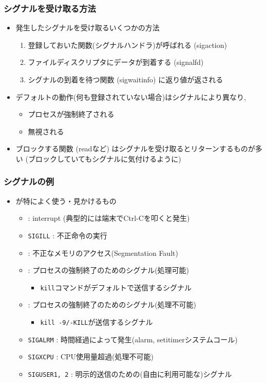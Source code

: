 \documentclass[12pt,dvipdfmx]{beamer}
\begin{document}
\begin{frame}
  \frametitle{シグナルを受け取る方法}
  \begin{itemize}
  \item 発生したシグナルを受け取るいくつかの方法
    \begin{enumerate}
    \item 登録しておいた関数(シグナルハンドラ)が呼ばれる (sigaction)
    \item ファイルディスクリプタにデータが到着する (signalfd)
    \item シグナルの到着を待つ関数 (sigwaitinfo) に返り値が返される
    \end{enumerate}
  \item デフォルトの動作(何も登録されていない場合)はシグナルにより異なり,
    \begin{itemize}
    \item プロセスが強制終了される
    \item 無視される
    \end{itemize}
  \item ブロックする関数 (readなど) はシグナルを受け取るとリターンするものが多い
    (ブロックしていてもシグナルに気付けるように)
  \end{itemize}
\end{frame}

\begin{frame}
  \frametitle{シグナルの例}
  \begin{itemize}
  \item []
    が特によく使う・見かけるもの
    \begin{itemize}
    \item {} : interrupt (典型的には端末でCtrl-Cを叩くと発生)
    \item {\tt SIGILL} : 不正命令の実行
    \item {} : 不正なメモリのアクセス(Segmentation Fault)
    \item {} : プロセスの強制終了のためのシグナル(処理可能)
      \begin{itemize}
      \item {\tt kill}コマンドがデフォルトで送信するシグナル
      \end{itemize}
    \item {} :
      プロセスの強制終了のためのシグナル(処理不可能)
      \begin{itemize}
      \item {\tt kill -9/-KILL}が送信するシグナル
      \end{itemize}
    \item {\tt SIGALRM} :
      時間経過によって発生(alarm, setitimerシステムコール)
    \item {\tt SIGXCPU} :
      CPU使用量超過(処理不可能)
    \item {\tt SIGUSER1, 2} :
      明示的送信のための(自由に利用可能な)シグナル
    \end{itemize}
  \end{itemize}
\end{frame}
\end{document}
